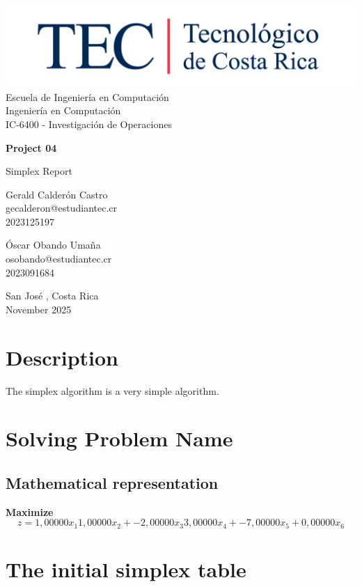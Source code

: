 \documentclass[12pt,a4paper]{report}
\makeatletter
\def \unidad{Escuela de Ingeniería en Computación}
\def \programa{Ingeniería en Computación}
\def \curso{IC-6400 - Investigación de Operaciones}
\def \titulo{Project 04}
\def \subtitulo{Simplex Report}
\def \autores{
    Gerald Calderón Castro\\
    gecalderon@estudiantec.cr\\
    2023125197\\

    \vspace{0.5cm}

    Óscar Obando Umaña\\
    osobando@estudiantec.cr\\
    2023091684
}
\def \fecha{November 2025}
\def \lugar{San José , Costa Rica}
\makeatother
\begin{document}
\begin{titlepage}
    \begin{center}
        \vspace*{1cm}

        \includegraphics[width=0.8\linewidth]{logo_tec.jpg}\\

        \LARGE
        \unidad\\
        \programa\\
        \curso

        \vspace{1cm}

        \Huge
        \textbf{\titulo}

        \vspace{0.5cm}
        \LARGE
        \subtitulo

        \vspace{1.5cm}

        \large
        \autores

        \vfill

        \lugar\\
        \fecha

    \end{center}
\end{titlepage}
\tableofcontents

\section{Description}
The simplex algorithm is a very simple algorithm.
\section{Solving Problem Name}
\subsection{Mathematical representation}
\textbf{Maximize}
\begin{dmath}
z = 1,00000x_{1}1,00000x_{2}+-2,00000x_{3}3,00000x_{4}+-7,00000x_{5}+0,00000x_{6}\end{dmath}
\section{The initial simplex table}
\end{document}
